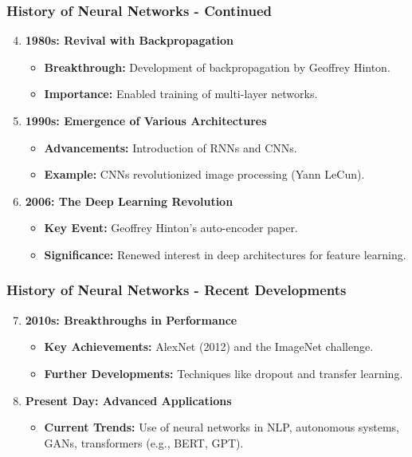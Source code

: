 \documentclass[aspectratio=169]{beamer}
\begin{document}
\begin{frame}[fragile]
    \frametitle{History of Neural Networks - Continued}
    \begin{enumerate}
        \setcounter{enumi}{3}
        \item \textbf{1980s: Revival with Backpropagation}
            \begin{itemize}
                \item \textbf{Breakthrough:} Development of backpropagation by Geoffrey Hinton.
                \item \textbf{Importance:} Enabled training of multi-layer networks.
            \end{itemize}

        \item \textbf{1990s: Emergence of Various Architectures}
            \begin{itemize}
                \item \textbf{Advancements:} Introduction of RNNs and CNNs.
                \item \textbf{Example:} CNNs revolutionized image processing (Yann LeCun).
            \end{itemize}

        \item \textbf{2006: The Deep Learning Revolution}
            \begin{itemize}
                \item \textbf{Key Event:} Geoffrey Hinton's auto-encoder paper.
                \item \textbf{Significance:} Renewed interest in deep architectures for feature learning.
            \end{itemize}
    \end{enumerate}
\end{frame}

\begin{frame}[fragile]
    \frametitle{History of Neural Networks - Recent Developments}
    \begin{enumerate}
        \setcounter{enumi}{6}
        \item \textbf{2010s: Breakthroughs in Performance}
            \begin{itemize}
                \item \textbf{Key Achievements:} AlexNet (2012) and the ImageNet challenge.
                \item \textbf{Further Developments:} Techniques like dropout and transfer learning.
            \end{itemize}

        \item \textbf{Present Day: Advanced Applications}
            \begin{itemize}
                \item \textbf{Current Trends:} Use of neural networks in NLP, autonomous systems, GANs, transformers (e.g., BERT, GPT).
            \end{itemize}
    \end{enumerate}
\end{frame}
\end{document}
